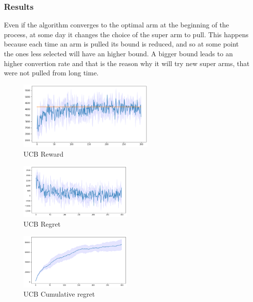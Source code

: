 \subsubsection{Results}
Even if the algorithm converges to the optimal arm at the beginning of the process, at some day it changes the choice of the super arm to pull. This happens because each time an arm is pulled its bound is reduced, and so at some point the ones less selected will have an higher bound. A bigger bound leads to an higher convertion rate and that is the reason why it will try new super arms, that were not pulled from long time.
\begin{figure}[ht]
    \begin{center}
    \includegraphics[width=0.6\textwidth]{img/ucb3.png}
    \caption{UCB Reward}
    \label{fig:reward31}
    \end{center}
\end{figure}
\begin{multicols}{2}
    \begin{figure}[H]
        \begin{center}
        \includegraphics[width=0.5\textwidth]{img/ucb3_regret.png}
        \caption{UCB Regret}
        \label{fig:regret31}
        \end{center}
    \end{figure}
    \columnbreak
    \begin{figure}[H]
        \begin{center}
        \includegraphics[width=0.5\textwidth]{img/ucb3_cum_reg.png}
        \caption{UCB Cumulative regret}
        \label{fig:cum_reg31}
        \end{center}
    \end{figure}
\end{multicols}


